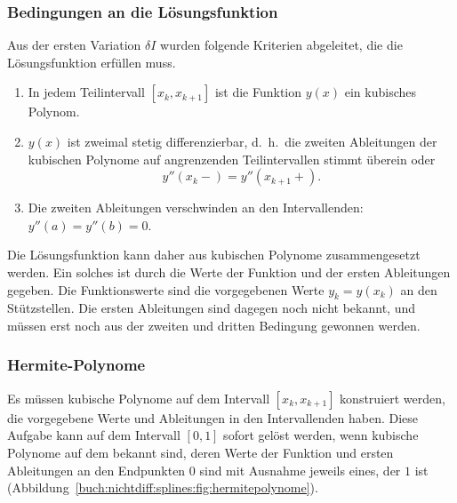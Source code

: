 %
%
\subsubsection{Bedingungen an die Lösungsfunktion}
Aus der ersten Variation $\delta I$ wurden folgende Kriterien abgeleitet,
die die Lösungsfunktion erfüllen muss.
\begin{enumerate}
\item
In jedem Teilintervall $[x_k,x_{k+1}]$ ist die Funktion $y(x)$ ein 
kubisches Polynom.
\item
$y(x)$ ist zweimal stetig differenzierbar, d.~h.~die zweiten Ableitungen
der kubischen Polynome auf angrenzenden Teilintervallen stimmt überein oder
\[
y''(x_k-) = y''(x_{k+1}+).
\]
\item
Die zweiten Ableitungen verschwinden an den Intervallenden: $y''(a)=y''(b)=0$.
\end{enumerate}
Die Lösungsfunktion kann daher aus kubischen Polynome zusammengesetzt werden.
Ein solches ist durch die Werte der Funktion und der ersten Ableitungen
gegeben.
Die Funktionswerte sind die vorgegebenen Werte $y_k=y(x_k)$ an den
Stützstellen.
Die ersten Ableitungen sind dagegen noch nicht bekannt, und müssen erst noch
aus der zweiten und dritten Bedingung gewonnen werden.

%
%
\subsubsection{Hermite-Polynome}

Es müssen kubische Polynome auf dem Intervall $[x_k,x_{k+1}]$ konstruiert
werden, die vorgegebene Werte und Ableitungen in den Intervallenden haben.
Diese Aufgabe kann auf dem Intervall $[0,1]$ sofort gelöst werden,
wenn kubische Polynome auf dem bekannt sind, deren Werte der Funktion
und ersten Ableitungen an den Endpunkten $0$ sind mit Ausnahme jeweils eines,
der $1$ ist (Abbildung~\ref{buch:nichtdiff:splines:fig:hermitepolynome}).

